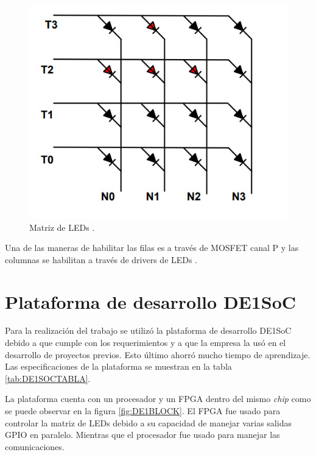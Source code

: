 \begin{figure}[htpb]
	\centering
	\includegraphics[scale=0.5]{Figures/ledmatrix.jpg} 
	\caption{Matriz de LEDs \protect\footnotemark.}
	\label{fig:matrizled}
\end{figure}


Una de las maneras de habilitar las filas es a través de MOSFET canal P y las columnas se habilitan a través de drivers de LEDs \citep{CONCEPTOMATRIZ}.




\section{ Plataforma de desarrollo DE1SoC}
Para la realización del trabajo se utilizó la plataforma de desarrollo DE1SoC debido a que cumple con los requerimientos y a que la empresa la usó en el desarrollo de proyectos previos. Esto último ahorró mucho tiempo de aprendizaje. Las especificaciones de la plataforma se muestran en la tabla \ref{tab:DE1SOCTABLA}.



La plataforma cuenta con un procesador y un FPGA dentro del mismo \textit{chip} como se puede observar en la figura  \ref{fig:DE1BLOCK}. El FPGA fue usado para controlar la matriz de LEDs debido a su capacidad de manejar varias salidas GPIO en paralelo. Mientras que el procesador fue usado para manejar las comunicaciones.

